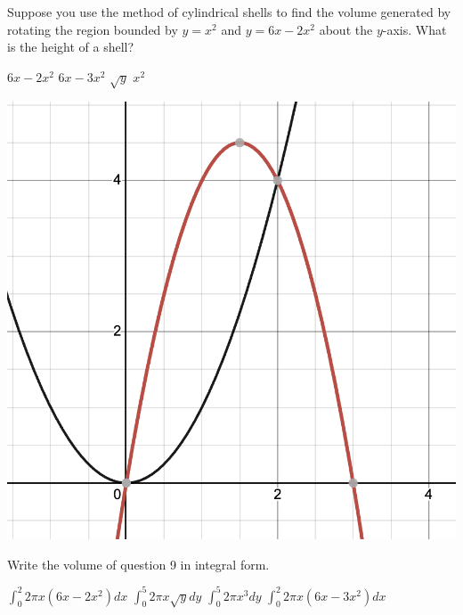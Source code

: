 \documentclass[addpoints, 12pt]{exam}%
\newcommand{\spc}{\vspace*{0.5cm}}
\begin{document}
\begin{questions}
\question[1]

Suppose you use the method of cylindrical shells to find the volume generated by rotating the region bounded by $y = x^2$ and $y = 6x - 2x^2$ about the $y$-axis. What is the height of a shell?

\begin{minipage}{0.5\textwidth}
\begin{choices}
\choice $6x - 2x^2$ \vspace*{10pt}
\CorrectChoice $6x-3x^2$ \vspace*{10pt}
\choice $\sqrt{y}$ \vspace*{10pt}
\choice $x^2$ \vspace*{10pt}
\end{choices}
\end{minipage}
\hspace*{1cm}
\begin{minipage}{0.35\textwidth}
\includegraphics[width=1\textwidth]{HW15graph4.png}
\end{minipage}


\spc

\question[1]

 Write the volume of question 9 in integral form.

\begin{multicols}{2}
\begin{choices}
\choice $\int_{0}^{2} 2\pi x(6x-2x^2)dx$
\choice $\int_{0}^{5} 2\pi x\sqrt{y}dy$
\choice $\int_{0}^{5} 2\pi x^3dy$
\CorrectChoice  $\int_{0}^{2} 2\pi x(6x-3x^2)dx$
\end{choices}
\end{multicols}


\end{questions}
\end{document}
